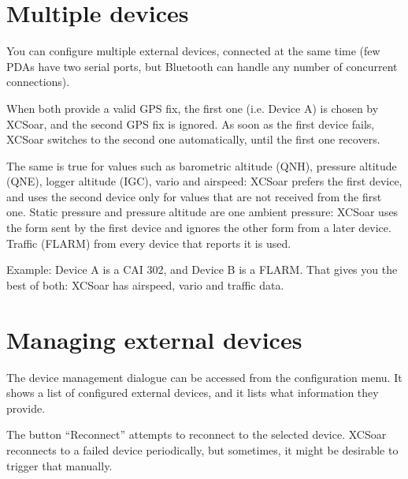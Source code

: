 \section{Multiple devices}

You can configure multiple external devices, connected at the same
time (few PDAs have two serial ports, but Bluetooth can handle any
number of concurrent connections).

When both provide a valid GPS fix, the first one (i.e. Device A) is chosen by
XCSoar, and the second GPS fix is ignored.  As soon as the first device fails,
XCSoar switches to the second one automatically, until the first one recovers.

The same is true for values such as barometric altitude (QNH),
pressure altitude (QNE), logger altitude (IGC), vario and
airspeed: XCSoar prefers the first device, and uses the second
device only for values that are not received from the first one.
Static pressure and pressure altitude are one ambient pressure:
XCSoar uses the form sent by the first device and ignores the other
form from a later device.
Traffic (FLARM) from every device that reports it is used.

Example: Device A is a CAI 302, and Device B is a FLARM.
That gives you the best of both: XCSoar has airspeed, vario and
traffic data.


\section{Managing external devices}

The device management dialogue can be accessed from the configuration
menu. It shows a list of configured external devices,
and it lists what information they provide.

The button ``Reconnect'' attempts to reconnect to the selected
device.  XCSoar reconnects to a failed device periodically, but
sometimes, it might be desirable to trigger that manually.


